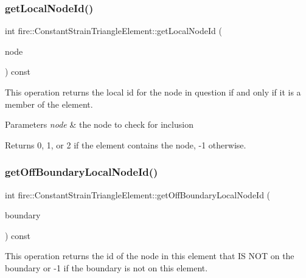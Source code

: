 \subsubsection{\texorpdfstring{get\+Local\+Node\+Id()}{getLocalNodeId()}}
{\footnotesize\ttfamily int fire\+::\+Constant\+Strain\+Triangle\+Element\+::get\+Local\+Node\+Id (\begin{DoxyParamCaption}\item[{const \hyperlink{a00210_a92dafcc05a788e1065a5792b67f0f70e}{Two\+D\+Node} \&}]{node }\end{DoxyParamCaption}) const}

This operation returns the local id for the node in question if and only if it is a member of the element. 
\begin{DoxyParams}{Parameters}
{\em node} & the node to check for inclusion \\
\hline
\end{DoxyParams}
\begin{DoxyReturn}{Returns}
0, 1, or 2 if the element contains the node, -\/1 otherwise. 
\end{DoxyReturn}
\mbox{\label{a00789_ae6dcd71f0f120db54cf96e3c2c4cf770}} 
\subsubsection{\texorpdfstring{get\+Off\+Boundary\+Local\+Node\+Id()}{getOffBoundaryLocalNodeId()}}
{\footnotesize\ttfamily int fire\+::\+Constant\+Strain\+Triangle\+Element\+::get\+Off\+Boundary\+Local\+Node\+Id (\begin{DoxyParamCaption}\item[{const \hyperlink{a00805}{Two\+D\+Robin\+Boundary\+Condition} \&}]{boundary }\end{DoxyParamCaption}) const}

This operation returns the id of the node in this element that IS N\+OT on the boundary or -\/1 if the boundary is not on this element. \mbox{\label{a00789_acf4734f5fbc56b700c29d637baf78b9f}} 
